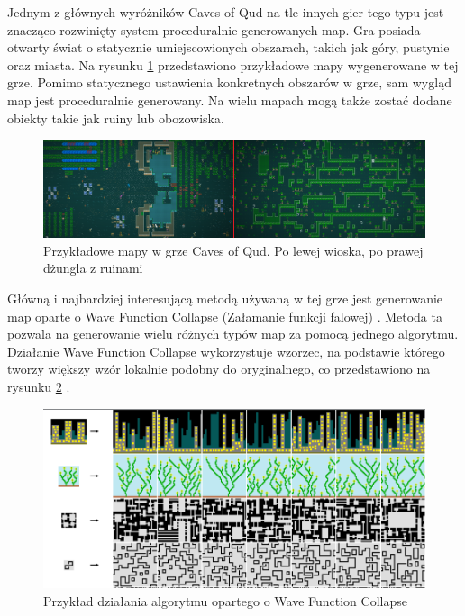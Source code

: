 \documentclass[12pt,twoside]{article}
\begin{document}
Jednym z głównych wyróżników Caves of Qud na tle innych gier tego typu jest znacząco rozwinięty system proceduralnie generowanych map. Gra posiada otwarty świat o statycznie umiejscowionych obszarach, takich jak góry, pustynie oraz miasta. Na rysunku \ref{CoQ:scr1} przedstawiono przykładowe mapy wygenerowane w tej grze. Pomimo statycznego ustawienia konkretnych obszarów w grze, sam wygląd map jest proceduralnie generowany. Na wielu mapach mogą także zostać dodane obiekty takie jak ruiny lub obozowiska.

\FloatBarrier
\begin{figure}[ht]
	\centering
	\includegraphics[width=16cm]{images/caves_of_qud/scr1.png}
	\caption{Przykładowe mapy w grze Caves of Qud. Po lewej wioska, po prawej dżungla z ruinami}
	\label{CoQ:scr1}
\end{figure}
\FloatBarrier

Główną i najbardziej interesującą metodą używaną w tej grze jest generowanie map oparte o Wave Function Collapse (Załamanie funkcji falowej) \cite{coq_wfc}. Metoda ta pozwala na generowanie wielu różnych typów map za pomocą jednego algorytmu. Działanie Wave Function Collapse wykorzystuje wzorzec, na podstawie którego tworzy większy wzór lokalnie podobny do oryginalnego, co przedstawiono na rysunku \ref{wfc} \cite{wfc_git}.

\FloatBarrier
\begin{figure}[ht]
	\centering
	\includegraphics[width=12cm]{images/wfc.png}
	\caption{Przykład działania algorytmu opartego o Wave Function Collapse}
	\label{wfc}
\end{figure}
\FloatBarrier
\end{document}
